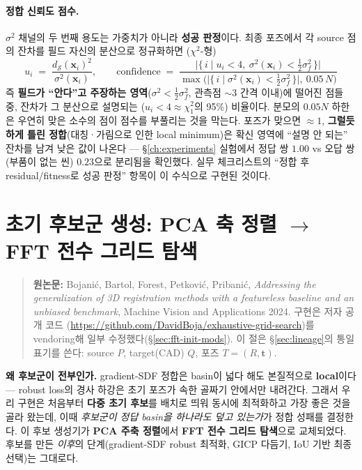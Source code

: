 \paragraph{정합 신뢰도 점수.} $\sigma^2$ 채널의 두 번째 용도는 가중치가
아니라 \textbf{성공 판정}이다. 최종 포즈에서 각 source 점의 잔차를 필드
자신의 분산으로 정규화하면 ($\chi^2$-형)
\begin{equation*}
  u_i \;=\; \frac{d_{\mathcal{S}}(\mathbf{x}_i)^2}{\sigma^2(\mathbf{x}_i)},
  \qquad
  \text{confidence}
  \;=\; \frac{\big|\{\,i \mid u_i<4,\ \sigma^2(\mathbf{x}_i)<\tfrac12\sigma_f^2\,\}\big|}
       {\max\big(\big|\{\,i \mid \sigma^2(\mathbf{x}_i)<\tfrac12\sigma_f^2\,\}\big|,\ 0.05\,N\big)}
\end{equation*}
즉 \textbf{필드가 ``안다''고 주장하는 영역}($\sigma^2<\tfrac12\sigma_f^2$,
관측점 $\sim\!3$ 간격 이내)에 떨어진 점들 중, 잔차가 그 분산으로 설명되는
($u_i<4 \approx \chi^2_1$의 95\%) 비율이다. 분모의 $0.05N$ 하한은 우연히
맞은 소수의 점이 점수를 부풀리는 것을 막는다. 포즈가 맞으면 $\approx 1$,
\textbf{그럴듯하게 틀린 정합}(대칭·가림으로 인한 local minimum)은 확신
영역에 ``설명 안 되는'' 잔차를 남겨 낮은 값이 나온다 --- \S\ref{ch:experiments}
실험에서 정답 쌍 $1.00$ vs 오답 쌍(부품이 없는 씬) $0.23$으로 분리됨을
확인했다. 실무 체크리스트의 ``정합 후 residual/fitness로 성공 판정'' 항목이
이 수식으로 구현된 것이다.

\section{초기 후보군 생성: PCA 축 정렬 $\to$ FFT 전수 그리드 탐색}
\label{sec:fft-init}

\begin{quote}
  \small\textbf{원논문:} Bojanić, Bartol, Forest, Petković, Pribanić,
  \emph{Addressing the generalization of 3D registration methods with a
  featureless baseline and an unbiased benchmark}, Machine Vision and
  Applications 2024. 구현은 저자 공개 코드
  (\url{https://github.com/DavidBoja/exhaustive-grid-search})를 vendoring해
  일부 수정했다(\S\ref{sec:fft-init-mods}). 이 절은 \S\ref{sec:lineage}의
  통일 표기를 쓴다: source $P$, target(CAD) $Q$, 포즈 $T=(R,\mathbf{t})$.
\end{quote}

\textbf{왜 후보군이 전부인가.} gradient-SDF 정합은 basin이 넓다 해도
본질적으로 \textbf{local}이다 --- robust loss의 경사 하강은 초기 포즈가
속한 골짜기 안에서만 내려간다. 그래서 우리 구현은 처음부터 \textbf{다중
초기 후보}를 배치로 띄워 동시에 최적화하고 가장 좋은 것을 골라 왔는데,
이때 \emph{후보군이 정답 basin을 하나라도 덮고 있는가}가 정합 성패를
결정한다. 이 후보 생성기가 \textbf{PCA 주축 정렬}에서 \textbf{FFT 전수
그리드 탐색}으로 교체되었다. 후보를 만든 \emph{이후}의 단계(gradient-SDF
robust 최적화, GICP 다듬기, IoU 기반 최종 선택)는 그대로다.

